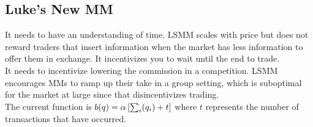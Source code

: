 \subsection{Luke's New MM}

It needs to have an understanding of time. LSMM scales with price but does not reward traders that insert information when the market has less information to offer them in exchange. It incentivizes you to wait until the
end to trade. \\

It needs to incentivize lowering the commission in a competition. LSMM 
encourages MMs to ramp up their take in a group setting, which is
suboptimal for the market at large since that disincentivizes trading. \\

The current function is $b(q) = \alpha \left[\sum_{i}(q_i) + t \right]$ where $t$ represents the number of transactions that have occurred.
